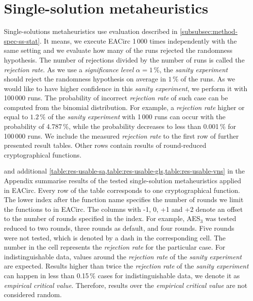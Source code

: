 \documentclass[
    digital,    %
    oneside,    %
    color,
    11pt,
    nocover,
    notable,
    nolof,
    nolot,
]{fithesis3}
\begin{document}
\section{Single-solution metaheuristics}
\label{sec:res-ss}

Single-solutions metaheuristics use evaluation described in \cref{subsubsec:method-spec-ss-stat}. It means, we execute EACirc 1\,000 times independently with the same setting and we evaluate how many of the runs rejected the randomness hypothesis. The number of rejections divided by the number of runs is called the \textit{rejection rate}. As we use a \textit{significance level} $\alpha=1\,\%$, the \textit{sanity experiment} should reject the randomness hypothesis on average in $1\,\%$ of the runs. As we would like to have higher confidence in this \textit{sanity experiment}, we perform it with 100\,000 runs. The probability of incorrect \textit{rejection rate} of such case can be computed from the binomial distribution. For example, a \textit{rejection rate} higher or equal to $1.2\,\%$ of the \textit{sanity experiment} with 1\,000 runs can occur with the probability of 4.787\,\%, while the probability decreases to less than 0.001\,\% for 100\,000 runs. We include the measured \textit{rejection rate} to the first row of further presented result tables. Other rows contain results of round-reduced cryptographical functions.

 and additional \cref{table:res-usable-sa,table:res-usable-gls,table:res-usable-vns} in the Appendix summarise results of the tested single-solution metaheuristics applied in EACirc. Every row of the table corresponds to one cryptographical function. The lower index after the function name specifies the number of rounds we limit the functions to in EACirc. The columns with -1, 0, +1 and +2 denote an offset to the number of rounds specified in the index. For example, AES$_{3}$ was tested reduced to two rounds, three rounds as default, and four rounds. Five rounds were not tested, which is denoted by a dash in the corresponding cell. The number in the cell represents the \textit{rejection rate} for the particular case. For indistinguishable data, values around the \textit{rejection rate} of the \textit{sanity experiment} are expected. Results higher than twice the \textit{rejection rate} of the \textit{sanity experiment} can happen in less than 0.15\,\% cases for indistinguishable data, we denote it as \textit{empirical critical value}. Therefore, results over the \textit{empirical critical value} are not considered random.
\end{document}
